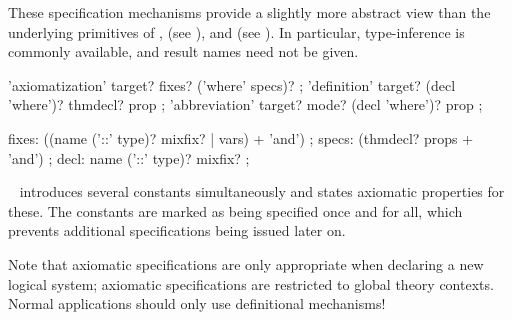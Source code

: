 \begin{isabellebody}
\begin{isamarkuptext}
  These specification mechanisms provide a slightly more abstract view
  than the underlying primitives of \hyperlink{command.consts}{\mbox{}}, \hyperlink{command.defs}{\mbox{}} (see ), and \hyperlink{command.axioms}{\mbox{}} (see
  ).  In particular, type-inference is commonly
  available, and result names need not be given.

  \begin{rail}
    'axiomatization' target? fixes? ('where' specs)?
    ;
    'definition' target? (decl 'where')? thmdecl? prop
    ;
    'abbreviation' target? mode? (decl 'where')? prop
    ;

    fixes: ((name ('::' type)? mixfix? | vars) + 'and')
    ;
    specs: (thmdecl? props + 'and')
    ;
    decl: name ('::' type)? mixfix?
    ;
  \end{rail}

  \begin{description}
  
  \item \hyperlink{command.axiomatization}{\mbox{}}~
  introduces several constants simultaneously and states axiomatic
  properties for these.  The constants are marked as being specified
  once and for all, which prevents additional specifications being
  issued later on.
  
  Note that axiomatic specifications are only appropriate when
  declaring a new logical system; axiomatic specifications are
  restricted to global theory contexts.  Normal applications should
  only use definitional mechanisms!


\end{description}
\end{isamarkuptext}
\end{isabellebody}
